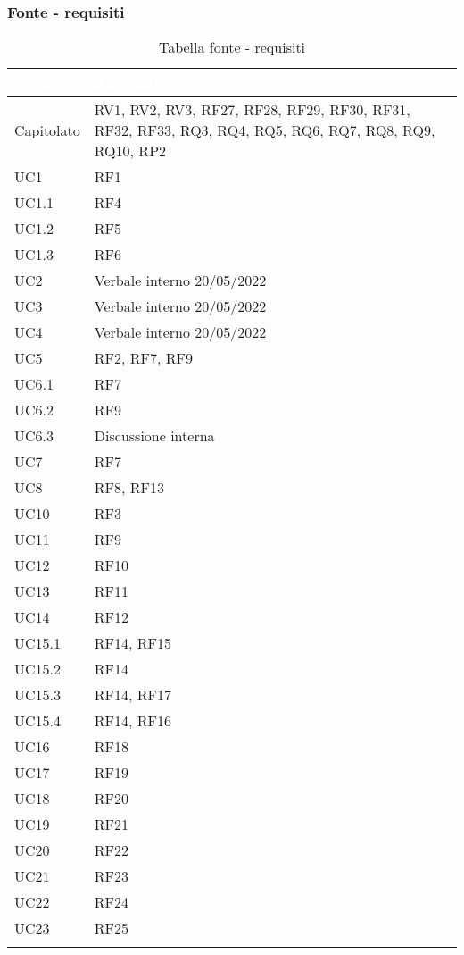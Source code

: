 \subsubsection{Fonte - requisiti}
{
      \setlength{\freewidth}{\dimexpr\textwidth-0\tabcolsep}
      \renewcommand{\arraystretch}{1.5}
      \centering
      \setlength{\aboverulesep}{0pt}
      \setlength{\belowrulesep}{0pt}
      \begin{longtable}{C{.47\freewidth} C{.47\freewidth}}
         \toprule
      \textcolor{white}{\textbf{Fonte}}&
      \textcolor{white}{\textbf{Requisiti}}\\
      \toprule
      \endhead
      
      Capitolato & RV1, RV2, RV3, RF27, RF28, RF29, RF30, RF31, RF32, RF33,
                   RQ3, RQ4, RQ5, RQ6, RQ7, RQ8, RQ9, RQ10,
                   RP2\\
      UC1 & RF1\\
      UC1.1 & RF4\\
      UC1.2 & RF5\\
      UC1.3 & RF6\\
      UC2 & Verbale interno 20/05/2022\\
      UC3 & Verbale interno 20/05/2022\\
      UC4 & Verbale interno 20/05/2022\\
      UC5 & RF2, RF7, RF9\\
      UC6.1 & RF7\\
      UC6.2 & RF9\\
      UC6.3 & Discussione interna\\
      UC7 & RF7 \\
      UC8 & RF8, RF13 \\
      UC10 & RF3 \\
      UC11 & RF9\\
      UC12 & RF10\\
      UC13 & RF11\\
      UC14 & RF12\\
      UC15.1 & RF14, RF15\\
      UC15.2 & RF14\\
      UC15.3 & RF14, RF17\\
      UC15.4 & RF14, RF16\\
      UC16 & RF18\\
      UC17 & RF19\\
      UC18 & RF20\\
      UC19 & RF21\\
      UC20 & RF22\\
      UC21 & RF23\\
      UC22 & RF24\\
      UC23 & RF25\\		
      \bottomrule
      \caption{Tabella fonte - requisiti}
      \end{longtable}
}
\newpage
